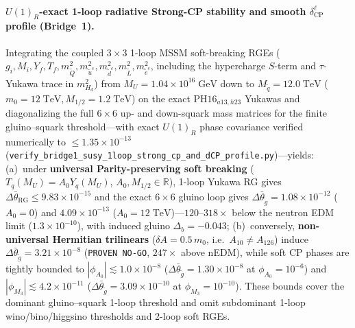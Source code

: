 \documentclass[11pt,a4paper]{article}
\begin{document}
\paragraph{$U(1)_R$-exact 1-loop radiative Strong-CP stability and smooth $\delta_{\mathrm{CP}}^\ell$ profile (Bridge~1).}
Integrating the coupled $3\times 3$ 1-loop MSSM soft-breaking RGEs ($g_i, M_i, Y_f, T_f, m_{\tilde Q}^2, m_{\tilde u^c}^2, m_{\tilde d^c}^2, m_{\tilde L}^2, m_{\tilde e^c}^2$, including the hypercharge $S$-term and $\tau$-Yukawa trace in $m_{H_d}^2$) from $M_U = 1.04\times 10^{16}\;\mathrm{GeV}$ down to $M_{\tilde q} = 12.0\;\mathrm{TeV}$ ($m_0 = 12\;\mathrm{TeV}, M_{1/2} = 1.2\;\mathrm{TeV}$) on the exact $\mathrm{PH16}_{a13,h23}$ Yukawas and diagonalizing the full $6\times 6$ up- and down-squark mass matrices for the finite gluino--squark threshold---with exact $U(1)_R$ phase covariance verified numerically to $\le 1.35\times 10^{-13}$ (\texttt{verify\_bridge1\_susy\_1loop\_strong\_cp\_and\_dCP\_profile.py})---yields:
(a)~under \textbf{universal Parity-preserving soft breaking} ($T_q(M_U) = A_0 Y_q(M_U)$, $A_0, M_{1/2} \in \mathbb{R}$), 1-loop Yukawa RG gives $\Delta\bar\theta_{\mathrm{RG}} \le 9.83\times 10^{-15}$ and the exact $6\times 6$ gluino loop gives $\Delta\bar\theta_{\tilde g} = 1.08\times 10^{-12}$ ($A_0 = 0$) and $4.09\times 10^{-13}$ ($A_0 = 12\;\mathrm{TeV}$)---$120\text{--}318\times$ below the neutron EDM limit ($1.3\times 10^{-10}$), with induced gluino $\Delta_b = -0.043$;
(b)~conversely, \textbf{non-universal Hermitian trilinears} ($\delta A = 0.5\,m_0$, i.e.\ $A_{10}\neq A_{126}$) induce $\Delta\bar\theta_{\tilde g} = 3.21\times 10^{-8}$ (\texttt{PROVEN NO-GO}, $247\times$ above nEDM), while soft CP phases are tightly bounded to $|\phi_{A_0}| \lesssim 1.0\times 10^{-8}$ ($\Delta\bar\theta_{\tilde g} = 1.30\times 10^{-8}$ at $\phi_{A_0}=10^{-6}$) and $|\phi_{M_3}| \lesssim 4.2\times 10^{-11}$ ($\Delta\bar\theta_{\tilde g} = 3.09\times 10^{-10}$ at $\phi_{M_3}=10^{-10}$). These bounds cover the dominant gluino--squark 1-loop threshold and omit subdominant 1-loop wino/bino/higgsino thresholds and 2-loop soft RGEs.
\end{document}
